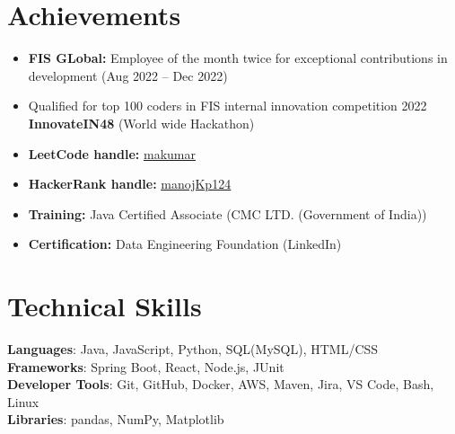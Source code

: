 \documentclass[letterpaper,11pt]{article}
\newcommand{\resumeItem}[1]{
  \item\small{
    {#1 \vspace{-2pt}}
  }
}
\newcommand{\resumeItemListStart}{\begin{itemize}}
\newcommand{\resumeItemListEnd}{\end{itemize}\vspace{-5pt}}
\begin{document}
\section{Achievements}
\resumeItemListStart
    \resumeItem{
    \textbf{FIS GLobal: }Employee of the month twice for exceptional contributions in development (Aug 2022 – Dec 2022)}
     \vspace{-5pt}
    \resumeItem{Qualified for top 100 coders in FIS internal innovation competition 2022 \textbf{InnovateIN48} (World wide Hackathon)}
     \vspace{-5pt}
    \resumeItem{\textbf{LeetCode handle:} \href{https://leetcode.com/makumar/}{\underline{makumar}}}
    \vspace{-5pt}
    \resumeItem{\textbf{HackerRank handle:} \href{https://www.hackerrank.com/manojkp124}{\underline{manojKp124}}}
    \vspace{-5pt}
    \resumeItem{\textbf{Training:} Java Certified Associate (CMC LTD. (Government of India))} 
    \vspace{-5pt}
    \resumeItem{\textbf{Certification:} Data Engineering Foundation (LinkedIn)} 
    \vspace{-5pt}
\resumeItemListEnd


%
\section{Technical Skills}
 \begin{itemize}[leftmargin=0.15in, label={}]
    \small{\item{
     \textbf{Languages}{: Java, JavaScript, Python, SQL(MySQL), HTML/CSS} \\
     \textbf{Frameworks}{: Spring Boot, React, Node.js, JUnit } \\
     \textbf{Developer Tools}{: Git, GitHub, Docker, AWS, Maven, Jira, VS Code, Bash, Linux} \\
     \textbf{Libraries}{: pandas, NumPy, Matplotlib}
    }}
 \end{itemize}


\end{document}
